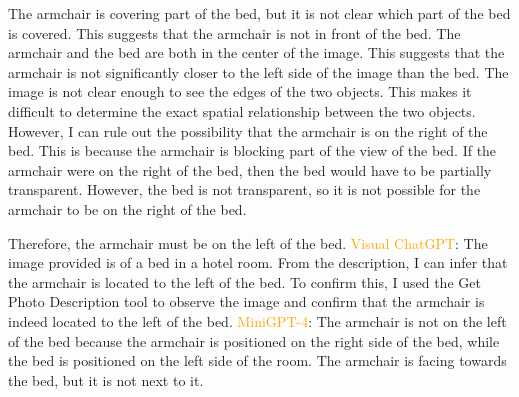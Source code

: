 \begin{enumerate}
    The armchair is covering part of the bed, but it is not clear which part of the bed is covered. This suggests that the armchair is not in front of the bed.
    The armchair and the bed are both in the center of the image. This suggests that the armchair is not significantly closer to the left side of the image than the bed.
    The image is not clear enough to see the edges of the two objects. This makes it difficult to determine the exact spatial relationship between the two objects.
    However, I can rule out the possibility that the armchair is on the right of the bed. This is because the armchair is blocking part of the view of the bed. If the armchair were on the right of the bed, then the bed would have to be partially transparent. However, the bed is not transparent, so it is not possible for the armchair to be on the right of the bed.

    Therefore, the armchair must be on the left of the bed.
    \subitem \textcolor{orange}{Visual ChatGPT}: The image provided is of a bed in a hotel room. From the description, I can infer that the armchair is located to the left of the bed. To confirm this, I used the Get Photo Description tool to observe the image and confirm that the armchair is indeed located to the left of the bed.
    \subitem \textcolor{orange}{MiniGPT-4}: The armchair is not on the left of the bed because the armchair is positioned on the right side of the bed, while the bed is positioned on the left side of the room. The armchair is facing towards the bed, but it is not next to it.
\end{enumerate}
